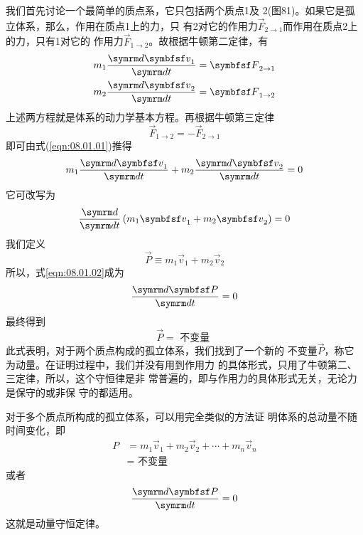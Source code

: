 我们首先讨论一个最简单的质点系，它只包括两个质点1及
2(图81)。如果它是孤立体系，那么，作用在质点1上的力，只
有2对它的作用力$ \vec { F } _ { 2 \to 1 } $而作用在质点2上的力，只有1对它的
作用力$ \vec { F } _ { 1 \to 2 } $。故根据牛顿第二定律，有
\begin{equation}\label{eqn:08.01.01}
  \begin{split}
    m _ { 1 } \frac { \dif \vec { v } _ { 1 } } { \dif t } = \vec { F } _ { 2 \to 1 }  \\
    m _ { 2 } \frac { \dif \vec { v } _ { 2 } } { \dif t } = \vec { F } _ { 1 \to 2 }
  \end{split}
\end{equation}
上述两方程就是体系的动力学基本方程。再根据牛顿第三定律
\begin{equation*}
  \vec { F } _ { 1 \to 2 } = - \vec { F } _ { 2 \to 1 }
\end{equation*}
即可由式(\eqref{eqn:08.01.01})推得
\begin{equation*}
  m _ { 1 } \frac { \dif \vec { v } _ { 1 } } { \dif t } + m _ { 2 } \frac { \dif \vec { v } _ { 2 } } { \dif t } = 0
\end{equation*}
它可改写为
\begin{equation}\label{eqn:08.01.02}
  \frac { \dif } { \dif t } \left( m _ { 1 } \vec { v } _ { 1 } + m _ { 2 } \vec { v } _ { 2 } \right) = 0
\end{equation}
我们定义
\begin{equation}\label{eqn:08.01.03}
  \vec{ P } \equiv m _ { 1 } \vec { v } _ { 1 } + m _ { 2 } \vec { v } _ { 2 }
\end{equation}
所以，式\eqref{eqn:08.01.02}成为
\begin{equation}\label{eqn:08.01.04}
  \frac { \dif \vec { P } } { \dif t } = 0
\end{equation}
最终得到\vspace{-1.56em}
\begin{equation}\label{eqn:08.01.05}
  \vec { P } = \text { 不变量 }
\end{equation}
此式表明，对于两个质点构成的孤立体系，我们找到了一个新的
不变量$ \vec { P } $，称它为动量。在证明过程中，我们并没有用到作用力
的具体形式，只用了牛顿第二、三定律，所以，这个守恒律是非
常普遍的，即与作用力的具体形式无关，无论力是保守的或非保
守的都适用。

对于多个质点所构成的孤立体系，可以用完全类似的方法证
明体系的总动量不随时间变化，即
\begin{equation}\label{eqn:08.01.06}
  \begin{aligned}
    P & = m _ { 1 } \vec { v } _ { 1 } + m _ { 2 } \vec { v } _ { 2 } + \cdots + m _ { n } \vec { v } _ { n } \\
      & = \text { 不变量 }
  \end{aligned}
\end{equation}
或者\vspace{-1.56em}
\begin{equation}\label{eqn:08.01.07}
  \frac { \dif \vec { P } } { \dif t } = 0
\end{equation}
这就是动量守恒定律。

